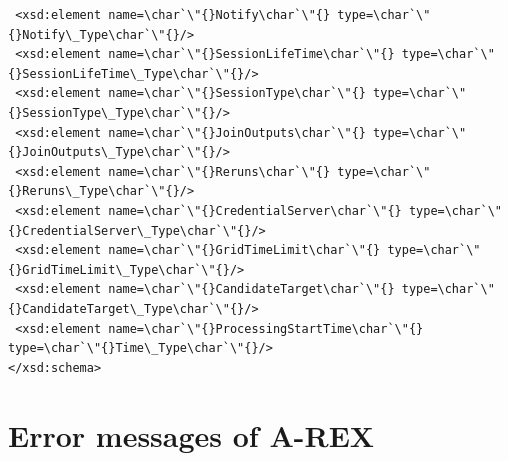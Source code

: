 \documentclass{article}                            %
\begin{document}
\begin{footnotesize}
\begin{verbatim}
 <xsd:element name=\char`\"{}Notify\char`\"{} type=\char`\"{}Notify\_Type\char`\"{}/>
 <xsd:element name=\char`\"{}SessionLifeTime\char`\"{} type=\char`\"{}SessionLifeTime\_Type\char`\"{}/>
 <xsd:element name=\char`\"{}SessionType\char`\"{} type=\char`\"{}SessionType\_Type\char`\"{}/>
 <xsd:element name=\char`\"{}JoinOutputs\char`\"{} type=\char`\"{}JoinOutputs\_Type\char`\"{}/>
 <xsd:element name=\char`\"{}Reruns\char`\"{} type=\char`\"{}Reruns\_Type\char`\"{}/>
 <xsd:element name=\char`\"{}CredentialServer\char`\"{} type=\char`\"{}CredentialServer\_Type\char`\"{}/>
 <xsd:element name=\char`\"{}GridTimeLimit\char`\"{} type=\char`\"{}GridTimeLimit\_Type\char`\"{}/>
 <xsd:element name=\char`\"{}CandidateTarget\char`\"{} type=\char`\"{}CandidateTarget\_Type\char`\"{}/>
 <xsd:element name=\char`\"{}ProcessingStartTime\char`\"{} type=\char`\"{}Time\_Type\char`\"{}/>
</xsd:schema>
\end{verbatim}
\end{footnotesize}

\section{Error messages of A-REX\label{annex:arex-errors}}
\end{document}
